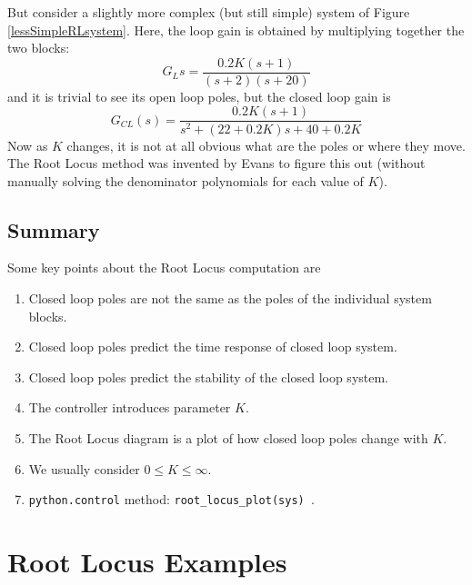 But consider a slightly more complex (but still simple) system of Figure \ref{lessSimpleRLsystem}.
Here, the loop gain is obtained by multiplying together the two blocks:
\[
G_L{s} = \frac{0.2K(s+1)}{(s+2)(s+20)}
\]
and it is trivial to see its open loop  poles, but the closed loop gain is
\[
G_{CL}(s) = \frac {0.2K(s+1)} {s^2 + (22+0.2K)s+40+0.2K}
\]
Now as $K$ changes,  it is not at all obvious what are the poles or where they move.  The Root Locus method was invented by Evans to figure this out (without manually solving the denominator polynomials for each value of $K$).


\subsection{Summary}
Some key points about the  Root Locus computation are

\begin{enumerate}
 \item Closed loop poles are not the same as the poles of the individual system blocks.
 \item Closed loop poles predict the time response of closed loop system.
 \item Closed loop poles predict the stability of the closed loop system.
 \item The controller introduces parameter $K$.
 \item The Root Locus diagram is a plot of how closed loop poles change with $K$.
 \item We usually consider $0 \le K \le \infty$.
 \item {\tt python.control} method:  {\tt root_locus_plot(sys) }.
\end{enumerate}






\section{Root Locus Examples}




